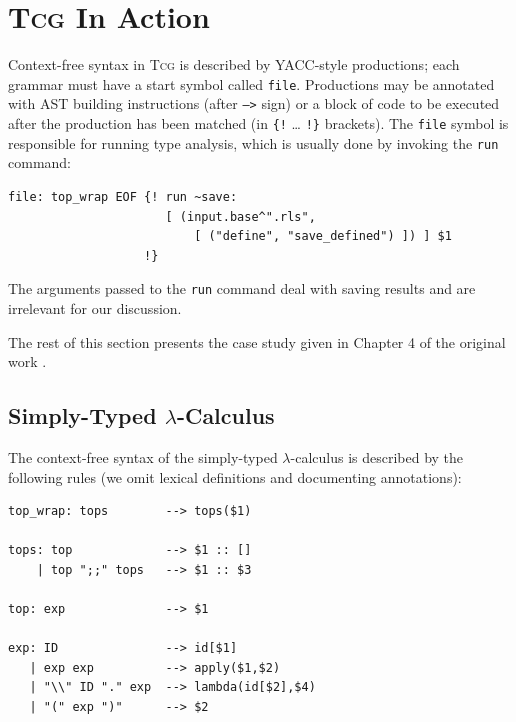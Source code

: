 \documentclass[a4paper,12pt]{article}
\newcommand{\Tcg}{\textsc{Tcg}}
\newcommand{\code}[1]{\texttt{#1}}
\begin{document}
\section{\Tcg{} In Action}

Context-free syntax in \Tcg{} is described by YACC-style productions; each grammar must have a start symbol called \code{file}. Productions may be annotated with AST building instructions (after \code{-->} sign) or a block of code to be executed after the production has been matched (in \code{\{!} \ldots{} \code{!\}} brackets). The \code{file} symbol is responsible for running type analysis, which is usually done by invoking the \code{run} command:

\begin{verbatim}
file: top_wrap EOF {! run ~save: 
                      [ (input.base^".rls",
                          [ ("define", "save_defined") ]) ] $1 
                   !}
\end{verbatim}

The arguments passed to the \code{run} command deal with saving results and are irrelevant for our discussion.

The rest of this section presents the case study given in Chapter 4 of the original work \cite{Tcg}. 

\subsection{Simply-Typed $\lambda$-Calculus}

The context-free syntax of the simply-typed $\lambda$-calculus is described by the following rules (we omit lexical definitions and documenting annotations):

\begin{verbatim}
top_wrap: tops        --> tops($1)

tops: top             --> $1 :: []
    | top ";;" tops   --> $1 :: $3

top: exp              --> $1

exp: ID               --> id[$1]
   | exp exp          --> apply($1,$2)
   | "\\" ID "." exp  --> lambda(id[$2],$4)
   | "(" exp ")"      --> $2
\end{verbatim}
\end{document}
